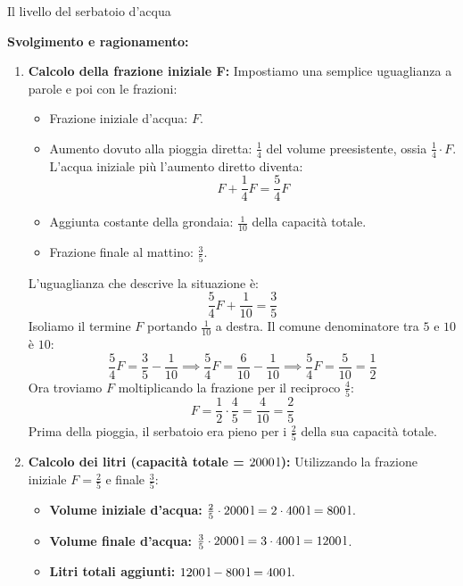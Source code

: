 \begin{esercizio}{Il livello del serbatoio d'acqua}
\begin{soluzione}
  \textbf{Svolgimento e ragionamento:}
  \begin{enumerate}[label=\alph*)]
    \item \textbf{Calcolo della frazione iniziale F:}
      Impostiamo una semplice uguaglianza a parole e poi con le frazioni:
      \begin{itemize}
        \item Frazione iniziale d'acqua: $F$.
        \item Aumento dovuto alla pioggia diretta: $\frac{1}{4}$ del volume preesistente, ossia $\frac{1}{4} \cdot F$. L'acqua iniziale più l'aumento diretto diventa:
          \[
          F + \frac{1}{4}F = \frac{5}{4}F
          \]
        \item Aggiunta costante della grondaia: $\frac{1}{10}$ della capacità totale.
        \item Frazione finale al mattino: $\frac{3}{5}$.
      \end{itemize}
      L'uguaglianza che descrive la situazione è:
      \[
      \frac{5}{4}F + \frac{1}{10} = \frac{3}{5}
      \]
      Isoliamo il termine $F$ portando $\frac{1}{10}$ a destra. Il comune denominatore tra $5$ e $10$ è $10$:
      \[
      \frac{5}{4}F = \frac{3}{5} - \frac{1}{10} \implies \frac{5}{4}F = \frac{6}{10} - \frac{1}{10} \implies \frac{5}{4}F = \frac{5}{10} = \frac{1}{2}
      \]
      Ora troviamo $F$ moltiplicando la frazione per il reciproco $\frac{4}{5}$:
      \[
      F = \frac{1}{2} \cdot \frac{4}{5} = \frac{4}{10} = \frac{2}{5}
      \]
      Prima della pioggia, il serbatoio era pieno per i $\frac{2}{5}$ della sua capacità totale.
    \item \textbf{Calcolo dei litri (capacità totale = $2000\,\mathrm{l}$):}
      Utilizzando la frazione iniziale $F = \frac{2}{5}$ e finale $\frac{3}{5}$:
      \begin{itemize}
    \item \textbf{Volume iniziale d'acqua:} $\frac{2}{5} \cdot 2000\,\mathrm{l} = 2 \cdot 400\,\mathrm{l} = 800\,\mathrm{l}$.
        \item \textbf{Volume finale d'acqua:} $\frac{3}{5} \cdot 2000\,\mathrm{l} = 3 \cdot 400\,\mathrm{l} = 1200\,\mathrm{l}$.
        \item \textbf{Litri totali aggiunti:} $1200\,\mathrm{l} - 800\,\mathrm{l} = 400\,\mathrm{l}$.
      \end{itemize}
  \end{enumerate}
\end{soluzione}
\end{esercizio}


